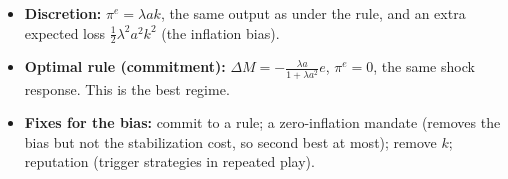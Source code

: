 \begin{keybox}[title=Summary]
\begin{itemize}
  \item \textbf{Discretion:} $\pi^e=\lambda ak$, the same output as under the rule, and an extra expected loss $\frac12\lambda^2a^2k^2$ (the inflation bias).
  \item \textbf{Optimal rule (commitment):} $\Delta M=-\frac{\lambda a}{1+\lambda a^2}e$, $\pi^e=0$, the same shock response. This is the best regime.
  \item \textbf{Fixes for the bias:} commit to a rule; a zero-inflation mandate (removes the bias but not the stabilization cost, so second best at most); remove $k$; reputation (trigger strategies in repeated play).
\end{itemize}
\end{keybox}
